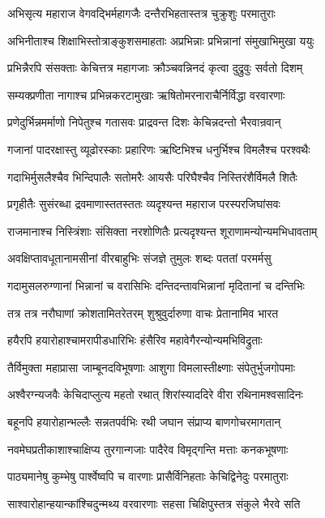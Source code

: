 \twolineshloka
{अभिसृत्य महाराज वेगवद्भिर्महागजैः}
{दन्तैरभिहतास्तत्र चुक्रुशुः परमातुराः}


\twolineshloka
{अभिनीताश्च शिक्षाभिस्तोत्राङ्कुशसमाहताः}
{अप्रभिन्नाः प्रभिन्नानां संमुखाभिमुखा ययुः}


\twolineshloka
{प्रभिन्नैरपि संसक्ताः केचित्तत्र महागजाः}
{क्रौञ्चवन्निनदं कृत्वा दुद्रुवुः सर्वतो दिशम्}


\twolineshloka
{सम्यक्प्रणीता नागाश्च प्रभिन्नकरटामुखाः}
{ऋषितोमरनाराचैर्निर्विद्धा वरवारणाः}


\twolineshloka
{प्रणेदुर्भिन्नमर्माणो निपेतुश्च गतासवः}
{प्राद्रवन्त दिशः केचिन्नदन्तो भैरवान्रवान्}


\twolineshloka
{गजानां पादरक्षास्तु व्यूढोरस्काः प्रहारिणः}
{ऋष्टिभिश्च धनुर्भिश्च विमलैश्च परश्वथैः}


\threelineshloka
{गदाभिर्मुसलैश्चैव भिन्दिपालैः सतोमरैः}
{आयसैः परिघैश्चैव निस्तिरंशैर्विमलै शितैः}
{}


\twolineshloka
{प्रगृहीतैः सुसंरब्धा द्रवमाणास्ततस्ततः}
{व्यदृश्यन्त महाराज परस्परजिघांसवः}


\twolineshloka
{राजमानाश्च निस्त्रिंशाः संसिक्ता नरशोणितैः}
{प्रत्यदृश्यन्त शूराणामन्योन्यमभिधावताम्}


\twolineshloka
{अवक्षिप्तावधूतानामसीनां वीरबाहुभिः}
{संजज्ञे तुमुलः शब्दः पततां परमर्मसु}


\twolineshloka
{गदामुसलरुग्णानां भिन्नानां च वरासिभिः}
{दन्तिदन्तावभिन्नानां मृदितानां च दन्तिभिः}


\twolineshloka
{तत्र तत्र नरौघाणां क्रोशतामितरेतरम्}
{शुश्रुवुर्दारुणा वाचः प्रेतानामिव भारत}


\twolineshloka
{हयैरपि हयारोहाश्चामरापीडधारिभिः}
{हंसैरिव महावेगैरन्योन्यमभिविद्रुताः}


\twolineshloka
{तैर्विमुक्ता महाप्रासा जाम्बूनदविभूषणाः}
{आशुगा विमलास्तीक्ष्णाः संपेतुर्भुजगोपमाः}


\twolineshloka
{अश्वैरग्न्यजवैः केचिदाप्लुत्य महतो रथात्}
{शिरांस्याददिरे वीरा रथिनामश्वसादिनः}


\twolineshloka
{बहूनपि हयारोहान्भल्लैः सन्नतपर्वभिः}
{रथी जघान संप्राप्य बाणगोचरमागतान्}


\twolineshloka
{नवमेघप्रतीकाशाश्चाक्षिप्य तुरगान्गजाः}
{पादैरेव विमृद्गन्ति मत्ताः कनकभूषणाः}


\twolineshloka
{पाठ्यमानेषु कुम्भेषु पार्श्वेष्वपि च वारणाः}
{प्रासैर्विनिहताः केचिद्विनेदुः परमातुराः}


\twolineshloka
{साश्वारोहान्हयान्कांश्चिदुन्मथ्य वरवारणाः}
{सहसा चिक्षिपुस्तत्र संकुले भैरवे सति}


